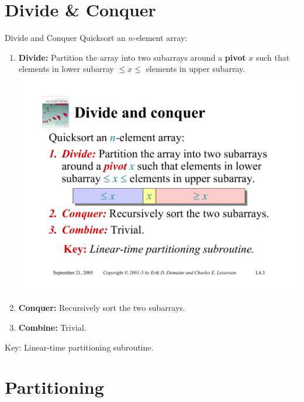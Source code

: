 \documentclass{beamer}
\begin{document}
\section{Divide \& Conquer}

\begin{frame}{Divide and Conquer}
    Quicksort an $n$-element array:
    \begin{enumerate}
        \item \textbf{\Large Divide:} Partition the array into two subarrays around a \textbf{pivot} $x$ such that elements in lower subarray $\leq x \leq$ elements in upper subarray.
            \includegraphics[width=\textwidth, trim={2cm 7.25cm 2cm 9.75cm}, clip]{pages/lec4_3} 
        \item \textbf{\Large Conquer:} Recursively sort the two subarrays.
        \item \textbf{\Large Combine:} Trivial.
    \end{enumerate}
    \begin{alertblock}{Key:}
        Linear-time partitioning subroutine.
    \end{alertblock}
\end{frame}

\section{Partitioning}
\end{document}
